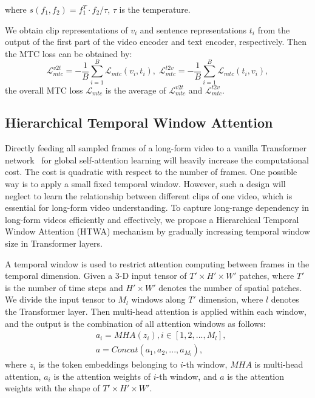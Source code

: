 \documentclass{article}
\begin{document}
where $s(f_1,f_2)=f^T_1 \cdot f_2 / \tau$, $\tau$ is the temperature.

We obtain clip representations of $v_i$ and sentence representations $t_i$ from the output of the first part of the video encoder and text encoder, respectively. Then the MTC loss can be obtained by:
\begin{equation}
    \mathcal{L}_{mtc}^{v2t} =-\frac{1}{B} \sum_{i=1}^{B} \mathcal{L}_{mtc}(v_i, t_i), \;
    \mathcal{L}_{mtc}^{t2v} =-\frac{1}{B} \sum_{i=1}^{B} \mathcal{L}_{mtc}(t_i, v_i),
\end{equation}
the overall MTC loss $\mathcal{L}_{mtc}$ is the average of $\mathcal{L}_{mtc}^{v2t}$ and $\mathcal{L}_{mtc}^{t2v}$.


\subsection{Hierarchical Temporal Window Attention}\label{tem_window}
Directly feeding all sampled frames of a long-form video to a vanilla Transformer network~\cite{vaswani2017transformer} for global self-attention learning will heavily increase the computational cost. The cost is quadratic with respect to the number of frames.
One possible way is to apply a small fixed temporal window. However, such a design will neglect to learn the relationship between different clips of one video, which is essential for long-form video understanding. To capture long-range dependency in long-form videos efficiently and effectively, we propose a Hierarchical Temporal Window Attention (HTWA) mechanism by gradually increasing temporal window size in Transformer layers.

A temporal window is used to restrict attention computing between frames in the temporal dimension. Given a 3-D input tensor of $T' \times H' \times W'$ patches, where $T'$ is the number of time steps and $H' \times W'$ denotes the number of spatial patches. We divide the input tensor to $M_l$ windows along $T'$ dimension, where $l$ denotes the Transformer layer. Then multi-head attention is applied within each window, and the output is the combination of all attention windows as follows:
\begin{equation}
\begin{aligned}
    & a_i = MHA\left(z_i\right), i \in [1,2,...,M_l], \\
    & a = Concat\left(a_1, a_2, ..., a_{M_l}\right),
\end{aligned}
\end{equation}
where $z_i$ is the token embeddings belonging to $i$-th window, $MHA$ is multi-head attention, $a_i$ is the attention weights of $i$-th window, and $a$ is the attention weights with the shape of $T' \times H' \times W'$.
\end{document}
